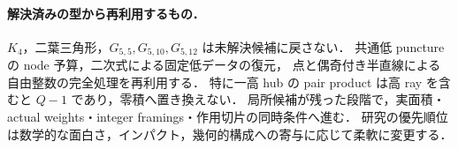 \paragraph{解決済みの型から再利用するもの．}
$K_4$，二葉三角形，$G_{5,5},G_{5,10},G_{5,12}$ は未解決候補に戻さない．
共通低 puncture の node 予算，二次式による固定低データの復元，
点と偶奇付き半直線による自由整数の完全処理を再利用する．
特に一高 hub の pair product は高 ray を含むと $Q-1$ であり，零積へ置き換えない．
局所候補が残った段階で，実面積・actual weights・integer framings・作用切片の同時条件へ進む．
研究の優先順位は数学的な面白さ，インパクト，幾何的構成への寄与に応じて柔軟に変更する．
